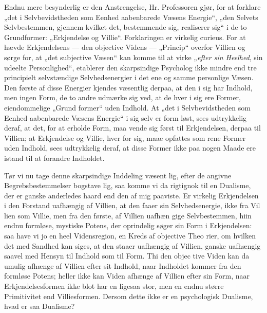 \documentclass[12pt]{book}
\newcommand{\opage}[1]{\marginnote{\footnotesize\textit{[#1]}}}
\begin{document}
Endnu mere besynderlig er den Anstrengelse, Hr.
Professoren gjør, for at forklare „det i Selvbevidstheden
som Eenhed aabenbarede Væsens Energie“, „den Selvets
Selvbestemmen, gjennem kvilket det, bestemmende sig,
realiserer sig“ i de to Grundformer: „Erkjendelse og
Villie“. Forklaringen er virkelig curieus. For at hævde
Erkjendelsens --- den objective Videns --- „Princip“
overfor Villien og sørge for, at „det subjective Væsen“
\opage{39}\setcounter{footnote}{0}%
kan komme til at virke „\emph{efter sin Heelhed}, sin udeelte
Personlighed“, etablerer den skarpsindige Psycholog ikke
mindre end tre principielt selvstændige Selvhedsenergier
i det ene og samme personlige Væsen. Den første af
disse Energier kjendes væsentlig derpaa, at den i sig
har Indhold, men ingen Form, de to andre udmærke sig
ved, at de hver i sig ere Former, eiendommelige „Grund\-%
former“ uden Indhold. At „det i Selvbevidstheden som
Eenhed aabenbarede Væsens Energie“ i sig selv er form\-%
løst, sees udtrykkelig deraf, at det, for at erholde Form,
maa vende sig først til Erkjendelsen, derpaa til Villien;
at Erkjendelse og Villie, hver for sig, maae opfattes som
rene Former uden Indhold, sees udtrykkelig deraf, at
disse Former ikke paa nogen Maade ere istand til at
forandre Indholdet.

Tør vi nu tage denne skarpsindige Inddeling væsent\-%
lig, efter de angivne Begrebsbestemmelser bogstave\-%
lig, saa komme vi da rigtignok til en Dualisme, der
er ganske anderledes haard end den af mig paaviste.
Er virkelig Erkjendelsen i den Forstand uafhængig af
Villien, at den faaer sin Selvhedsenergie, ikke fra Vil\-%
lien som Villie, men fra den første, af Villien uafhæn\-%
gige Selvbestemmen, hiin endnu formløse, mystiske Potens,
der oprindelig søger sin Form i Erkjendelsen: saa have
vi jo en heel Vidensregion, en Kreds af objective Theo\-%
rier, om hvilken det med Sandhed kan siges, at den
staaer uafhængig af Villien, ganske uafhængig saavel
med Hensyn til Indhold som til Form. Thi den objec\-%
tive Viden kan da umulig afhænge af Villien efter sit
Indhold, naar Indholdet kommer fra den formløse Potens;
heller ikke kan Viden afhænge af Villien efter sin Form,
naar Erkjendelsesformen ikke blot har en ligesaa stor,
men en endnu større Primitivitet end Villiesformen.
\opage{40}\setcounter{footnote}{0}%
Dersom dette ikke er en psychologisk Dualisme, hvad
er saa Dualisme?
\end{document}
